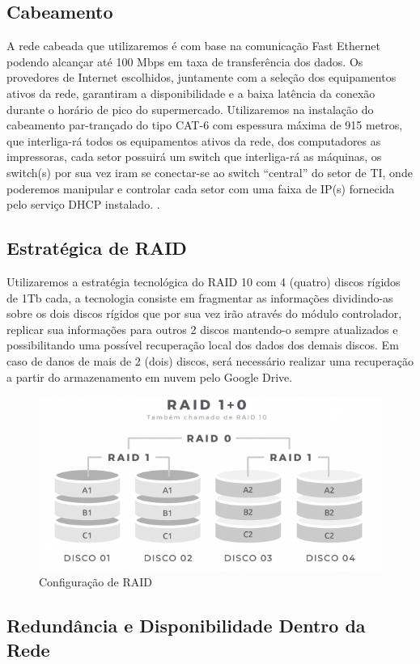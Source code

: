 \documentclass[12pt]{article}
\begin{document}
\subsection{Cabeamento}
A rede cabeada que utilizaremos é com base na comunicação Fast Ethernet podendo alcançar até 100 Mbps em taxa de transferência dos dados. Os provedores de Internet escolhidos, juntamente com a seleção dos equipamentos ativos da rede, garantiram a disponibilidade e a baixa latência da conexão durante o horário de pico do supermercado. Utilizaremos na instalação do cabeamento par-trançado do tipo CAT-6 com espessura máxima de 915 metros, que interliga-rá todos os equipamentos ativos da rede, dos computadores as impressoras, cada setor possuirá um switch que interliga-rá as máquinas, os switch(s) por sua vez iram se conectar-se ao switch “central” do setor de TI, onde poderemos manipular e controlar cada setor com uma faixa de IP(s) fornecida pelo serviço DHCP instalado.
.
\subsection{Estratégica de RAID}
Utilizaremos a estratégia tecnológica do RAID 10 com 4 (quatro) discos rígidos de 1Tb cada, a tecnologia consiste em fragmentar as informações dividindo-as sobre os dois discos rígidos que por sua vez irão através do módulo controlador, replicar sua informações para outros 2 discos mantendo-o sempre atualizados e possibilitando uma possível recuperação local dos dados dos demais discos. Em caso de danos de mais de 2 (dois) discos, será necessário realizar uma recuperação a partir do armazenamento em nuvem pelo Google Drive.

\begin{figure}[ht]
\centering
\includegraphics[height=0.3\textwidth]{RAID10.png}
\caption{Configuração de RAID}
\label{fig:adds-pastas}
\end{figure}

\subsection{Redundância e Disponibilidade Dentro da Rede}
\end{document}
